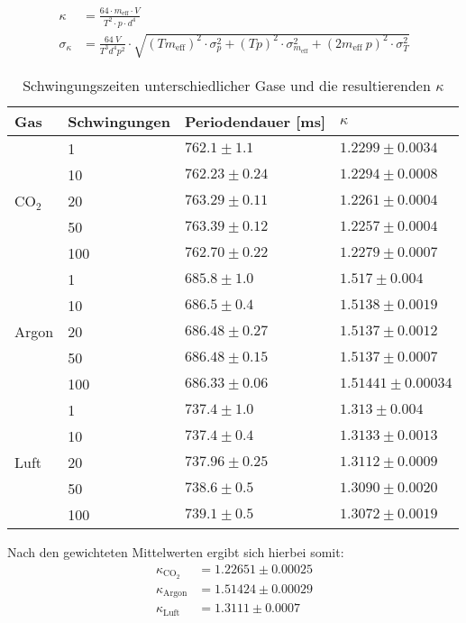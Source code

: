 \documentclass[12pt,a4paper,titlepage,headinclude,bibtotoc]{scrartcl}
\begin{document}
\begin{align*}
	\kappa&=\frac{64 \cdot m_{\text{eff}}\cdot V }{T^{2} \cdot p \cdot d^{4}}\\
	\sigma_{\kappa}&=\frac{64 ~ V}{T^{3}  d^{4}  p^{2}} \cdot \sqrt{\left(T  m_{\text{eff}}\right)^2 \cdot \sigma_{p}^{2} + \left(T  p\right)^2 \cdot \sigma_{m_{\text{eff}}}^{2} + \left(2m_{\text{eff}}~p\right)^{2} \cdot \sigma_{T}^{2}}
\end{align*}

\begin{table}
	\centering
	\begin{tabular}{|l|l|l|l|}
		\hline
		Gas 	&Schwingungen & Periodendauer [ms] & $\kappa$ \\\hline\hline
		
		& 1 & $762.1 \pm 1.1$ & $1.2299 \pm 0.0034$ \\
		& 10 & $762.23 \pm 0.24$ & $1.2294 \pm 0.0008$ \\
		CO$_2$
		& 20 & $763.29 \pm 0.11$ & $1.2261 \pm 0.0004$ \\
		& 50 & $763.39 \pm 0.12$ & $1.2257 \pm 0.0004$ \\
		& 100 & $762.70 \pm 0.22$ & $1.2279 \pm 0.0007$ \\\hline
		& 1 & $685.8 \pm 1.0$ & $1.517 \pm 0.004$ \\
		& 10 & $686.5 \pm 0.4$ & $1.5138 \pm 0.0019$ \\
		Argon
		& 20 & $686.48 \pm 0.27$ & $1.5137 \pm 0.0012$ \\
		& 50 & $686.48 \pm 0.15$ & $1.5137 \pm 0.0007$ \\
		& 100 & $686.33 \pm 0.06$ & $1.51441 \pm 0.00034$ \\\hline
		& 1 & $737.4 \pm 1.0$ & $1.313 \pm 0.004$ \\
		& 10 & $737.4 \pm 0.4$ & $1.3133 \pm 0.0013$ \\
		Luft
		& 20 & $737.96 \pm 0.25$ & $1.3112 \pm 0.0009$ \\
		& 50 & $738.6 \pm 0.5$ & $1.3090 \pm 0.0020$ \\
		& 100 & $739.1 \pm 0.5$ & $1.3072 \pm 0.0019$ \\\hline

	\end{tabular}
	\caption{Schwingungszeiten unterschiedlicher Gase und die resultierenden $\kappa$}
	\label{tab:schwingungszeit}
\end{table}
Nach den gewichteten Mittelwerten ergibt sich hierbei somit:
\begin{align*}
	\kappa_{\text{CO}_2}&=1.22651\pm 0.00025\\
	\kappa_\text{Argon} &=1.51424\pm 0.00029\\
	\kappa_\text{Luft}  &=1.3111\pm 0.0007
\end{align*}
\end{document}
